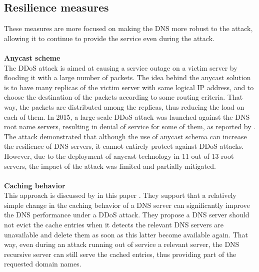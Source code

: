 \subsection{Resilience measures}
These measures are more focused on making the DNS more robust to the attack, allowing it to continue to provide the service 
even during the attack.\\
\\
\textbf{Anycast scheme}\\
The DDoS attack is aimed at causing a service outage on a victim server by flooding it with a large number of packets. The idea behind the 
anycast solution is to have many replicas of the victim server with same logical IP address, and to choose the destination of the packets
according to some routing criteria. That way, the packets are distributed among the replicas, thus reducing the load on each of them.
In 2015, a large-scale DDoS attack was launched against the DNS root name servers, resulting in denial of service for some of them, as reported by 
\cite{anycast}. The attack demonstrated that although the use of anycast schema can increase the resilience of DNS servers, it cannot entirely 
protect against DDoS attacks. However, due to the deployment of anycast technology in 11 out of 13 root servers, the impact of the attack was 
limited and partially mitigated.\\
\\
\textbf{Caching behavior}\\
This approach is discussed by \citeauthor{alleviatingimpact} in this paper \cite{alleviatingimpact}. They support that a relatively 
simple change in the caching behavior of a DNS server can significantly improve the DNS performance under a DDoS attack.
They propose a DNS server should not evict the cache entries when it detects the relevant DNS servers are unavailable and delete
them as soon as this latter become available again. That way, even during an attack running out of service a relevant server, the 
DNS recursive server can still serve the cached entries, thus providing part of the requested domain names.\\


